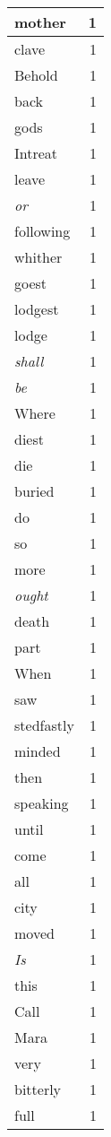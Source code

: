 \begin{center}
\begin{longtable}{l|r}
mother & 1 \\ \hline
clave & 1 \\ \hline
Behold & 1 \\ \hline
back & 1 \\ \hline
gods & 1 \\ \hline
Intreat & 1 \\ \hline
leave & 1 \\ \hline
\emph{or} & 1 \\ \hline
following & 1 \\ \hline
whither & 1 \\ \hline
goest & 1 \\ \hline
lodgest & 1 \\ \hline
lodge & 1 \\ \hline
\emph{shall} & 1 \\ \hline
\emph{be} & 1 \\ \hline
Where & 1 \\ \hline
diest & 1 \\ \hline
die & 1 \\ \hline
buried & 1 \\ \hline
do & 1 \\ \hline
so & 1 \\ \hline
more & 1 \\ \hline
\emph{ought} & 1 \\ \hline
death & 1 \\ \hline
part & 1 \\ \hline
When & 1 \\ \hline
saw & 1 \\ \hline
stedfastly & 1 \\ \hline
minded & 1 \\ \hline
then & 1 \\ \hline
speaking & 1 \\ \hline
until & 1 \\ \hline
come & 1 \\ \hline
all & 1 \\ \hline
city & 1 \\ \hline
moved & 1 \\ \hline
\emph{Is} & 1 \\ \hline
this & 1 \\ \hline
Call & 1 \\ \hline
Mara & 1 \\ \hline
very & 1 \\ \hline
bitterly & 1 \\ \hline
full & 1 \\ \hline

\end{longtable}
\end{center}
